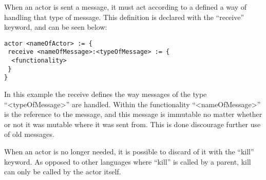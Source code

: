 
When an actor is sent a message, it must act according to a defined a way of handling that type of message. This definition is declared with the \enquote{receive} keyword, and can be seen below:

\label{actorfuncReceive}
\begin{lstlisting}
actor <nameOfActor> := {
 receive <nameOfMessage>:<typeOfMessage> := {
  <functionality>
 }
}
\end{lstlisting}

In this example the receive defines the way messages of the type \enquote{<typeOfMessage>} are handled. Within the functionality \enquote{<nameOfMessage>} is the reference to the message, and this message is immutable no matter whether or not it was mutable where it was sent from. This is done discourage further use of old messages.

When an actor is no longer needed, it is possible to discard of it with the \enquote{kill} keyword. As opposed to other languages where \enquote{kill} is called by a parent, kill can only be called by the actor itself. 